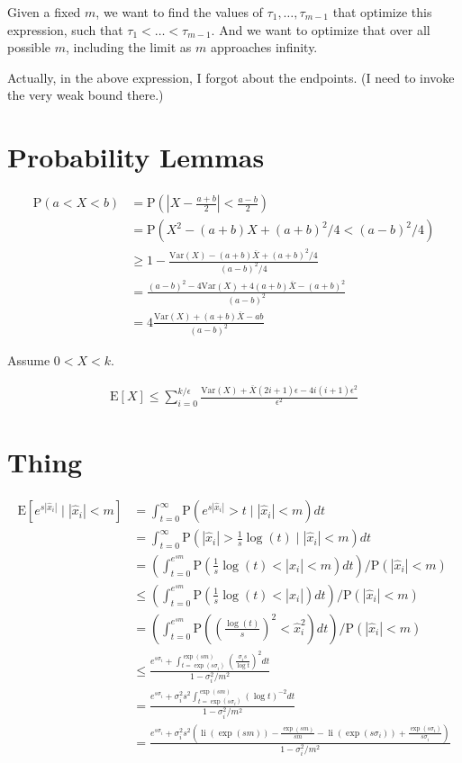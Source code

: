 \documentclass{article}
\newcommand \E[1] {\mathrm E \left[#1\right]} %
\newcommand \Var[1] {\mathrm {Var} \left(#1\right)} %
\newcommand \p[1] {\mathrm P \left(#1\right)}
\DeclareMathOperator{\li}{li}
\begin{document}
Given a fixed $m$, we want to find the values of $\tau_1,\ldots,\tau_{m-1}$ that optimize this expression, such that $\tau_1<\ldots<\tau_{m-1}$. And we want to optimize that over all possible $m$, including the limit as $m$ approaches infinity.

Actually, in the above expression, I forgot about the endpoints. (I need to invoke the very weak bound there.)

\section{Probability Lemmas}

\begin{align*}
\p{a<X<b} &= \p{\left|X-\frac{a+b}2\right|<\frac{a-b}2} \\
&= \p{X^2-(a+b)X+(a+b)^2/4 < (a-b)^2/4} \\
&\geq 1-\frac{\Var X - (a+b)\overline X + (a+b)^2/4}{(a-b)^2/4} \\
&= \frac{(a-b)^2 - 4\Var X + 4(a+b)\overline X - (a+b)^2}{(a-b)^2} \\
&= 4\frac{\Var X + (a+b)\overline X - ab}{(a-b)^2}
\end{align*}

Assume $0<X<k$.

\begin{align*}
\E X \leq \sum_{i=0}^{k/\epsilon} \frac{\Var X + \overline X(2i+1)\epsilon-4i(i+1)\epsilon^2}{\epsilon^2}
\end{align*}

\section{Thing}

\begin{align*}
\E{e^{s|\hat x_i|} \mid |\hat x_i|<m} &= \int_{t=0}^\infty \p{e^{s|\hat x_i|}>t \mid |\hat x_i|<m} dt\\ 
&= \int_{t=0}^\infty \p{|\hat x_i|>\frac 1 s \log(t) \mid |\hat x_i|<m} dt\\ 
&= \left(\int_{t=0}^{e^{sm}} \p{\frac 1 s \log(t) < |\hat x_i| < m} dt \right)\bigg/\p{|\hat x_i| < m} \\
&\leq \left(\int_{t=0}^{e^{sm}} \p{\frac 1 s \log(t) < |\hat x_i|} dt \right)\bigg/\p{|\hat x_i| < m} \\
&= \left(\int_{t=0}^{e^{sm}} \p{\left(\frac {\log(t)} s\right)^2 < \hat x_i^2} dt \right)\bigg/\p{|\hat x_i| < m} \\
&\leq \frac{e^{s \sigma_i} + \int_{t=\exp(s\sigma_i)}^{\exp(sm)} \left(\frac{\sigma_i s}{\log t}\right)^2 dt}{1-\sigma_i^2/m^2} \\
&= \frac{e^{s \sigma_i} + \sigma_i^2 s^2 \int_{t=\exp(s\sigma_i)}^{\exp(sm)} (\log t)^{-2} dt}{1-\sigma_i^2/m^2} \\
&= \frac{e^{s \sigma_i} + \sigma_i^2 s^2 \left(\li(\exp(sm))-\frac{\exp(sm)}{sm}-\li(\exp(s\sigma_i)) +\frac{\exp(s\sigma_i)}{s\sigma_i} \right)}{1-\sigma_i^2/m^2} \\
\end{align*}
\end{document}
